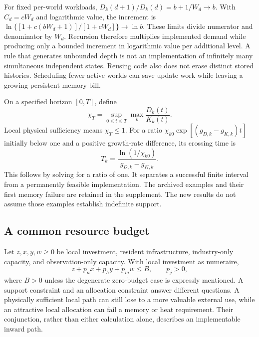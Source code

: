 For fixed per-world workloads,
$D_k(d+1)/D_k(d)=b+1/W_d\to b$. With $C_d=cW_d$ and logarithmic
value, the increment is
$\ln\{[1+c(bW_d+1)]/[1+cW_d]\}\to\ln b$.
These limits divide numerator and denominator by $W_d$. Recursion
therefore multiplies implemented demand while producing only a bounded
increment in logarithmic value per additional level. A rule that generates
unbounded depth is not an implementation of infinitely many simultaneous
independent states. Reusing code also does not erase distinct stored
histories. Scheduling fewer active worlds can save update work while
leaving a growing persistent-memory bill.

On a specified horizon $[0,T]$, define
\begin{equation}
 \chi_T=\sup_{0\leq t\leq T}\max_k\frac{D_k(t)}{K_k(t)}.
 \label{eq:chi}
\end{equation}
Local physical sufficiency means $\chi_T\leq1$. For a ratio
$\chi_{k0}\exp[(g_{D,k}-g_{K,k})t]$ initially below one and a positive
growth-rate difference, its crossing time is
\begin{equation}
 T_k=\frac{\ln(1/\chi_{k0})}{g_{D,k}-g_{K,k}}.\label{eq:crossing}
\end{equation}
This follows by solving for a ratio of one. It separates a successful
finite interval from a permanently feasible implementation. The archived
examples and their first memory failure are retained in the supplement.
The new results do not assume those examples establish indefinite support.

\subsection{A common resource budget}
Let $z,x,y,w\geq0$ be local investment, resident infrastructure,
industry-only capacity, and observation-only capacity. With local
investment as numeraire,
\begin{equation}
 z+p_nx+p_hy+p_mw\leq B,\qquad p_j>0,
 \label{eq:budget}
\end{equation}
where $B>0$ unless the degenerate zero-budget case is expressly mentioned.
A support constraint and an allocation constraint answer different
questions. A physically sufficient local path can still lose to a more
valuable external use, while an attractive local allocation can fail a
memory or heat requirement. Their conjunction, rather than either
calculation alone, describes an implementable inward path.
